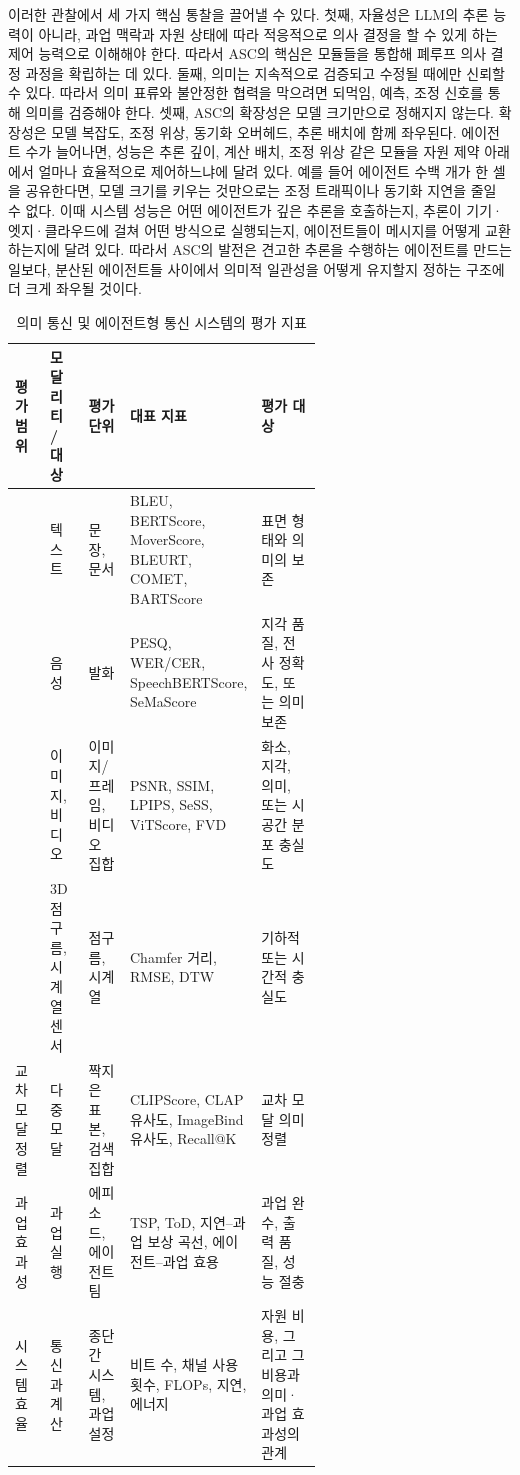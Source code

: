 이러한 관찰에서 세 가지 핵심 통찰을 끌어낼 수 있다. 첫째, 자율성은 LLM의 추론 능력이 아니라, 과업 맥락과 자원 상태에 따라 적응적으로 의사 결정을 할 수 있게 하는 제어 능력으로 이해해야 한다. 따라서 ASC의 핵심은 모듈들을 통합해 폐루프 의사 결정 과정을 확립하는 데 있다. 둘째, 의미는 지속적으로 검증되고 수정될 때에만 신뢰할 수 있다. 따라서 의미 표류와 불안정한 협력을 막으려면 되먹임, 예측, 조정 신호를 통해 의미를 검증해야 한다. 셋째, ASC의 확장성은 모델 크기만으로 정해지지 않는다. 확장성은 모델 복잡도, 조정 위상, 동기화 오버헤드, 추론 배치에 함께 좌우된다. 에이전트 수가 늘어나면, 성능은 추론 깊이, 계산 배치, 조정 위상 같은 모듈을 자원 제약 아래에서 얼마나 효율적으로 제어하느냐에 달려 있다. 예를 들어 에이전트 수백 개가 한 셀을 공유한다면, 모델 크기를 키우는 것만으로는 조정 트래픽이나 동기화 지연을 줄일 수 없다. 이때 시스템 성능은 어떤 에이전트가 깊은 추론을 호출하는지, 추론이 기기·엣지·클라우드에 걸쳐 어떤 방식으로 실행되는지, 에이전트들이 메시지를 어떻게 교환하는지에 달려 있다. 따라서 ASC의 발전은 견고한 추론을 수행하는 에이전트를 만드는 일보다, 분산된 에이전트들 사이에서 의미적 일관성을 어떻게 유지할지 정하는 구조에 더 크게 좌우될 것이다.

\setcounter{table}{9}
\begin{table}[htbp]
\centering
\caption{의미 통신 및 에이전트형 통신 시스템의 평가 지표}
\label{tab:10}
\footnotesize
\renewcommand{\arraystretch}{1.25}\renewcommand{\tabularxcolumn}[1]{m{#1}}
\begin{tabularx}{\linewidth}{>{\centering\arraybackslash}m{0.12\linewidth}|>{\centering\arraybackslash}m{0.13\linewidth}|>{\centering\arraybackslash}m{0.14\linewidth}|>{\centering\arraybackslash}X|>{\centering\arraybackslash}m{0.22\linewidth}}
\hline
\textbf{평가 범위} & \textbf{모달리티 / 대상} & \textbf{평가 단위} & \textbf{대표 지표} & \textbf{평가 대상} \\
\hline
\multirow{4}{=}{\centering 모달리티별} & 텍스트 & 문장, 문서 & BLEU, BERTScore, MoverScore, BLEURT, COMET, BARTScore & 표면 형태와 의미의 보존 \\
\cline{2-5}
 & 음성 & 발화 & PESQ, WER/CER, SpeechBERTScore, SeMaScore & 지각 품질, 전사 정확도, 또는 의미 보존 \\
\cline{2-5}
 & 이미지, 비디오 & 이미지/프레임, 비디오 집합 & PSNR, SSIM, LPIPS, SeSS, ViTScore, FVD & 화소, 지각, 의미, 또는 시공간 분포 충실도 \\
\cline{2-5}
 & 3D 점구름, 시계열 센서 & 점구름, 시계열 & Chamfer 거리, RMSE, DTW & 기하적 또는 시간적 충실도 \\
\hline
교차 모달 정렬 & 다중 모달 & 짝지은 표본, 검색 집합 & CLIPScore, CLAP 유사도, ImageBind 유사도, Recall@K & 교차 모달 의미 정렬 \\
\hline
과업 효과성 & 과업 실행 & 에피소드, 에이전트 팀 & TSP, ToD, 지연--과업 보상 곡선, 에이전트--과업 효용 & 과업 완수, 출력 품질, 성능 절충 \\
\hline
시스템 효율 & 통신과 계산 & 종단 간 시스템, 과업 설정 & 비트 수, 채널 사용 횟수, FLOPs, 지연, 에너지 & 자원 비용, 그리고 그 비용과 의미·과업 효과성의 관계 \\
\hline
\end{tabularx}
\end{table}
